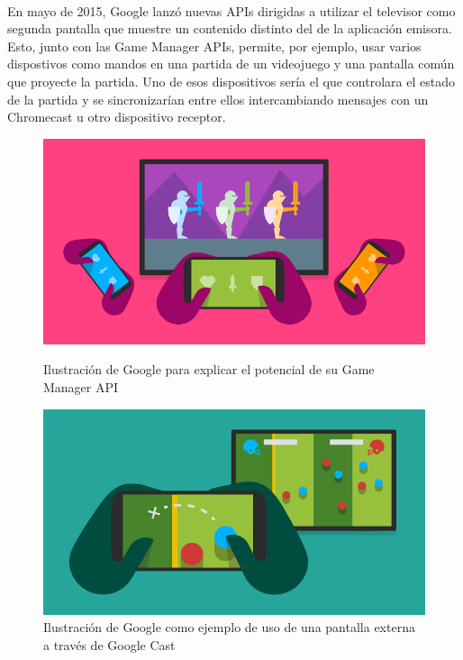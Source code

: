 \

En mayo de 2015, Google lanzó nuevas APIs dirigidas a utilizar el televisor como segunda pantalla que muestre un contenido distinto del de la aplicación emisora.
Esto, junto con las Game Manager APIs, permite, por ejemplo, usar varios dispostivos como mandos en una partida de un videojuego y una pantalla común que proyecte la partida.
Uno de esos dispositivos sería el que controlara el estado de la partida y se sincronizarían entre ellos intercambiando mensajes con un Chromecast u otro dispositivo receptor.

\begin{figure}[H]
	\centering
	\begin{minipage}[b]{.35\textwidth}
		\includegraphics[scale=0.3]{./Imagenes/games.png}
		\caption{Ilustración de Google para explicar el potencial de su Game Manager API}\label{fig:games}
	\end{minipage}\qquad
	\hspace{2cm}
	\begin{minipage}[b]{.35\textwidth}
		\includegraphics[scale=0.3]{./Imagenes/seconddisplay.png}
		\caption{Ilustración de Google como ejemplo de uso de una pantalla externa a través de Google Cast}\label{fig:seconddisplay}
	\end{minipage}
\end{figure}


